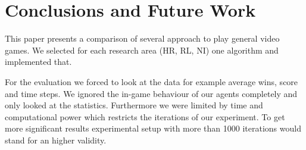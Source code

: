 \section{Conclusions and Future Work} 
\label{sec:conc}

This paper presents a comparison of several approach to play general video games. We selected for each research area (\ac{HR}, \ac{RL}, \ac{NI})
one algorithm and implemented that. 


For the evaluation we forced to look at the data for example average wins, score and time steps.
We ignored the in-game behaviour of our agents completely and only looked at the statistics. 
Furthermore we were limited by time and computational power which restricts the iterations of our experiment. 
To get more significant results experimental setup with more than 1000 iterations would stand for an higher validity.




